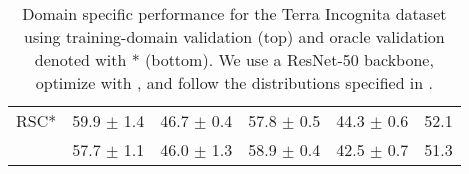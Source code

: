 \begin{table*}
\begin{center}
\begin{tabular}{lccccc}
RSC*                  & 59.9 $\pm$ 1.4       & 46.7 $\pm$ 0.4       & 57.8 $\pm$ 0.5       & 44.3 $\pm$ 0.6       & 52.1                  \\
\tdivcams 	          & 57.7 $\pm$ 1.1       & 46.0 $\pm$ 1.3        & 58.9 $\pm$ 0.4       & 42.5 $\pm$ 0.7        & 51.3                 \\
\bottomrule
\end{tabular}
\caption[Domain specific performance for the Terra Incognita dataset]{Domain specific performance for the Terra Incognita dataset using training-domain validation (top) and  oracle validation denoted with * (bottom). We use a ResNet-50 backbone, optimize with \adam, and follow the distributions specified in \domainbed.}
\end{center}
\end{table*}


